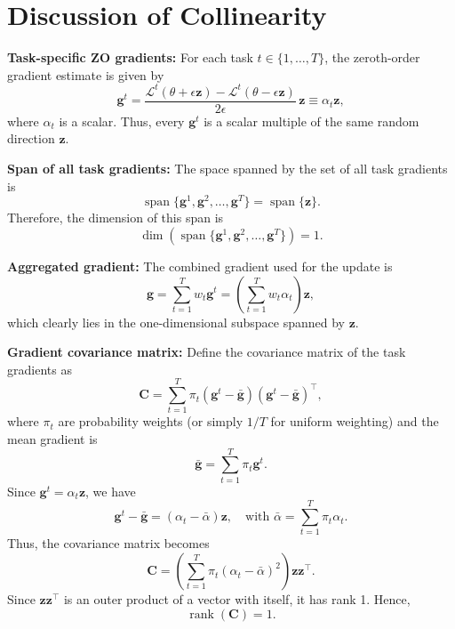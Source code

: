 \section{Discussion of Collinearity}
\label{app:collinear}
\textbf{Task-specific ZO gradients:} For each task \( t \in \{1,\dots,T\} \), the zeroth-order gradient estimate is given by
\begin{equation}
    \mathbf{g}^t = \frac{\mathcal{L}^t(\theta+\epsilon \mathbf{z}) - \mathcal{L}^t(\theta-\epsilon \mathbf{z})}{2\epsilon} \, \mathbf{z} \equiv \alpha_t \mathbf{z},
\end{equation}
where \(\alpha_t\) is a scalar. Thus, every \(\mathbf{g}^t\) is a scalar multiple of the same random direction \(\mathbf{z}\).

\textbf{Span of all task gradients:} The space spanned by the set of all task gradients is
\begin{equation}
    \operatorname{span}\{\mathbf{g}^1, \mathbf{g}^2, \dots, \mathbf{g}^T\} = \operatorname{span}\{\mathbf{z}\}.
\end{equation}
Therefore, the dimension of this span is
\begin{equation}
    \dim\left(\operatorname{span}\{\mathbf{g}^1, \mathbf{g}^2, \dots, \mathbf{g}^T\}\right) = 1.
\end{equation}

\textbf{Aggregated gradient:} The combined gradient used for the update is
\begin{equation}
    \mathbf{g} = \sum_{t=1}^T w_t \mathbf{g}^t = \left(\sum_{t=1}^T w_t \alpha_t \right) \mathbf{z},
\end{equation}
which clearly lies in the one-dimensional subspace spanned by \(\mathbf{z}\).

\textbf{Gradient covariance matrix:} Define the covariance matrix of the task gradients as
\begin{equation}
    \mathbf{C} = \sum_{t=1}^T \pi_t \left( \mathbf{g}^t - \bar{\mathbf{g}} \right)\left( \mathbf{g}^t - \bar{\mathbf{g}} \right)^\top,
\end{equation}
where \(\pi_t\) are probability weights (or simply \(1/T\) for uniform weighting) and the mean gradient is
\begin{equation}
    \bar{\mathbf{g}} = \sum_{t=1}^T \pi_t \mathbf{g}^t.
\end{equation}
Since \(\mathbf{g}^t = \alpha_t \mathbf{z}\), we have
\begin{equation}
    \mathbf{g}^t - \bar{\mathbf{g}} = (\alpha_t - \bar{\alpha}) \mathbf{z}, \quad \text{with } \bar{\alpha} = \sum_{t=1}^T \pi_t \alpha_t.
\end{equation}
Thus, the covariance matrix becomes
\begin{equation}
    \mathbf{C} = \left(\sum_{t=1}^T \pi_t (\alpha_t - \bar{\alpha})^2 \right) \mathbf{z} \mathbf{z}^\top.
\end{equation}
Since \(\mathbf{z}\mathbf{z}^\top\) is an outer product of a vector with itself, it has rank 1. Hence,
\begin{equation}
    \operatorname{rank}(\mathbf{C}) = 1.
\end{equation}

